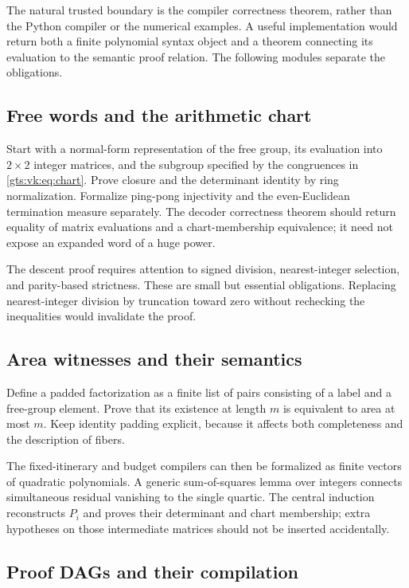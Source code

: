 \documentclass[11pt,letterpaper]{article}
\theoremstyle{definition}
\theoremstyle{remark}
\begin{document}
The natural trusted boundary is the compiler correctness theorem, rather than the Python compiler or the numerical examples. A useful implementation would return both a finite polynomial syntax object and a theorem connecting its evaluation to the semantic proof relation. The following modules separate the obligations.

\subsection{Free words and the arithmetic chart}

Start with a normal-form representation of the free group, its evaluation into $2\times2$ integer matrices, and the subgroup specified by the congruences in \eqref{gts:vk:eq:chart}. Prove closure and the determinant identity by ring normalization. Formalize ping-pong injectivity and the even-Euclidean termination measure separately. The decoder correctness theorem should return equality of matrix evaluations and a chart-membership equivalence; it need not expose an expanded word of a huge power.

The descent proof requires attention to signed division, nearest-integer selection, and parity-based strictness. These are small but essential obligations. Replacing nearest-integer division by truncation toward zero without rechecking the inequalities would invalidate the proof.

\subsection{Area witnesses and their semantics}

Define a padded factorization as a finite list of pairs consisting of a label and a free-group element. Prove that its existence at length $m$ is equivalent to area at most $m$. Keep identity padding explicit, because it affects both completeness and the description of fibers.

The fixed-itinerary and budget compilers can then be formalized as finite vectors of quadratic polynomials. A generic sum-of-squares lemma over integers connects simultaneous residual vanishing to the single quartic. The central induction reconstructs $P_i$ and proves their determinant and chart membership; extra hypotheses on those intermediate matrices should not be inserted accidentally.

\subsection{Proof DAGs and their compilation}
\end{document}
